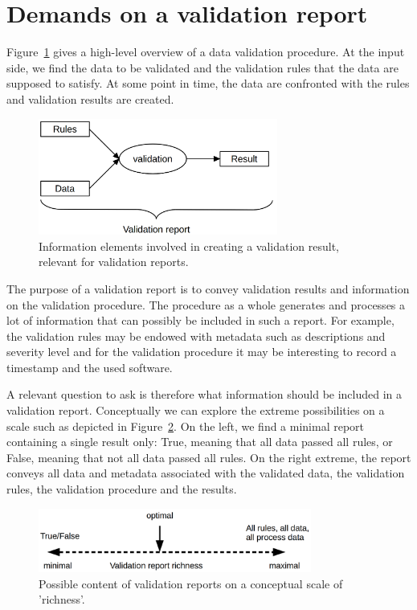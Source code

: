 \section{Demands on a validation report}
\label{sect:demands}
Figure~\ref{fig:validation} gives a high-level overview of a data validation
procedure. At the input side, we find the data to be validated and the
validation rules that the data are supposed to satisfy. At some point in time,
the data are confronted with the rules and validation results are created. 
%
\begin{figure}[t]
\centering
\includegraphics[width=0.7\textwidth]{fig/validation.png}
\caption{Information elements involved in creating a validation result, relevant for validation reports.}
\label{fig:validation}
\end{figure}

The purpose of a validation report is to convey validation results and
information on the validation procedure. The procedure as a whole generates and
processes a lot of information that can possibly be included in such a report.
For example, the validation rules may be endowed with metadata such as
descriptions and severity level and for the validation procedure it may be
interesting to record a timestamp and the used software.

A relevant question to ask is therefore what information should be included in
a validation report. Conceptually we can explore the extreme possibilities on a
scale such as depicted in Figure~\ref{fig:richness}. On the left, we find a minimal report
containing a single result only: True, meaning that all data passed all rules,
or False, meaning that not all data passed all rules. On the right extreme, the
report conveys all data and metadata associated with the validated data, the
validation rules, the validation procedure and the results.
%
\begin{figure}
\centering
\includegraphics[width=0.8\textwidth]{fig/richness.png}
\caption{Possible content of validation reports on a conceptual scale of 'richness'.}
\label{fig:richness}
\end{figure}


